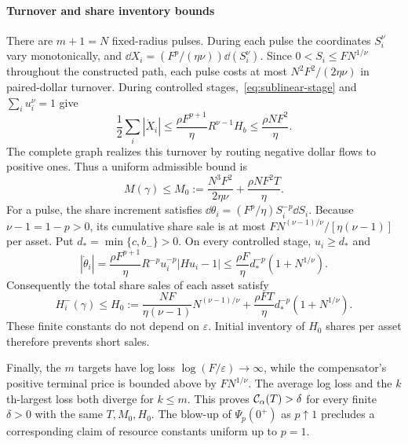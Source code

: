 \documentclass[review,hidelinks,onefignum,onetabnum]{siamonline250211}
\begin{document}
\paragraph{Turnover and share inventory bounds}
There are $m+1=N$ fixed-radius pulses.
During each pulse the coordinates $S_i^\nu$
vary monotonically, and
$\dd X_i=(F^p/(\eta\nu))\dd(S_i^\nu)$.
Since $0<S_i\le FN^{1/\nu}$ throughout
the constructed path, each pulse costs at most
$N^2F^2/(2\eta\nu)$ in paired-dollar turnover.
During controlled stages,~\eqref{eq:sublinear-stage}
and $\sum_i u_i^\nu=1$ give
\[
\frac12\sum_i|\dot X_i|
\le\frac{\rho F^{p+1}}{\eta}R^{\nu-1}H_b
\le\frac{\rho NF^2}{\eta}.
\]
The complete graph realizes this turnover by
routing negative dollar flows to positive ones.
Thus a uniform admissible bound is
\[
M(\gamma)\le M_0:=
\frac{N^3F^2}{2\eta\nu}
+\frac{\rho NF^2T}{\eta}.
\]
For a pulse, the share increment satisfies
$\dd\theta_i=(F^p/\eta)S_i^{-p}\dd S_i$.
Because $\nu-1=1-p>0$, its cumulative share
sale is at most
$FN^{(\nu-1)/\nu}/[\eta(\nu-1)]$ per asset.
Put $d_*=\min\{c,b_-\}>0$.
On every controlled stage, $u_i\ge d_*$ and
\[
|\dot\theta_i|=
\frac{\rho F^{p+1}}{\eta}
R^{-p}u_i^{-p}|Hu_i-1|
\le\frac{\rho F}{\eta}
d_*^{-p}(1+N^{1/\nu}).
\]
Consequently the total share sales of each
asset satisfy
\begin{equation}\label{eq:sublinear-inventory}
H_i^-(\gamma)\le H_0:=
\frac{NF}{\eta(\nu-1)}N^{(\nu-1)/\nu}
+\frac{\rho FT}{\eta}
d_*^{-p}(1+N^{1/\nu}).
\end{equation}
These finite constants do not depend on
$\varepsilon$. Initial inventory of $H_0$
shares per asset therefore prevents short sales.

Finally, the $m$ targets have log loss
$\log(F/\varepsilon)\to\infty$, while the
compensator's positive terminal price is bounded
above by $FN^{1/\nu}$. The average log loss
and the $k$th-largest loss both diverge for
$k\le m$. This proves
$\mathcal{C}_\alpha(T)>\delta$ for every finite
$\delta>0$ with the same $T,M_0,H_0$.
The blow-up of $\Psi_p(0^+)$ as $p\uparrow1$
precludes a corresponding claim of resource
constants uniform up to $p=1$.
\end{document}

